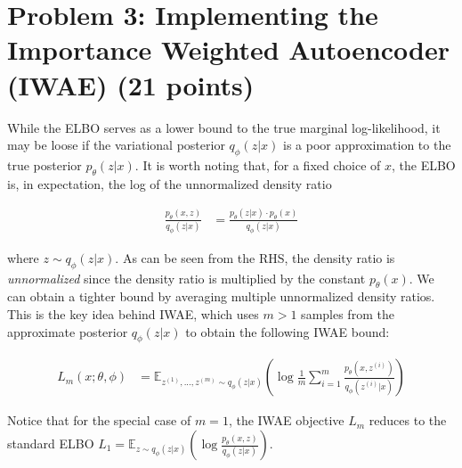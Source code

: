 \documentclass{article}
\theoremstyle{case}
\theoremstyle{definition}
\begin{document}
\newpage
\section*{Problem 3: Implementing the Importance Weighted Autoencoder (IWAE) (21 points)}

While the ELBO serves as a lower bound to the true marginal log-likelihood, it may be loose if the variational posterior $q_{\phi}(z|x)$ is a poor approximation to the true posterior $p_{\theta}(z|x)$. It is worth noting that, for a fixed choice of $x$, the ELBO is, in expectation, the log of the unnormalized density ratio

\begin{align*}
\frac{p_{\theta}(x, z)}{q_{\phi}(z|x)} &= \frac{p_{\theta}(z|x) \cdot p_{\theta}(x)}{q_{\phi}(z|x)}
\end{align*}

where $z \sim q_{\phi}(z|x)$. As can be seen from the RHS, the density ratio is \textit{unnormalized} since the density ratio is multiplied by the constant $p_{\theta}(x)$. We can obtain a tighter bound by averaging multiple unnormalized density ratios. This is the key idea behind IWAE, which uses $m > 1$ samples from the approximate posterior $q_{\phi}(z|x)$ to obtain the following IWAE bound:

\begin{align*}
L_{m}(x; \theta, \phi) &= \mathbb{E}_{z^{(1)},...,z^{(m)}\sim q_{\phi}(z|x)} \left( \log \frac{1}{m} \sum_{i=1}^{m} \frac{p_{\theta}(x, z^{(i)})}{q_{\phi}(z^{(i)}|x)} \right)
\end{align*}

Notice that for the special case of $m = 1$, the IWAE objective $L_{m}$ reduces to the standard ELBO $L_{1} = \mathbb{E}_{z\sim q_{\phi}(z|x)} \left( \log \frac{p_{\theta}(x,z)}{q_{\phi}(z|x)} \right)$.
\end{document}
